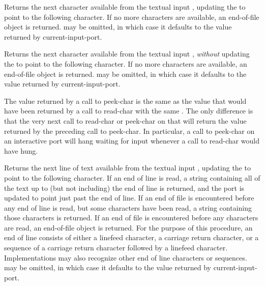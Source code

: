 \begin{entry}{%
}

Returns the next character available from the textual input ,
updating
the  to point to the following character.  If no more characters
are available, an end-of-file object is returned.   may be
omitted, in which case it defaults to the value returned by {\cf current-input-port}.

\end{entry}


\begin{entry}{%
}

Returns the next character available from the textual input ,
{\em without} updating
the  to point to the following character.  If no more characters
are available, an end-of-file object is returned.   may be
omitted, in which case it defaults to the value returned by {\cf current-input-port}.

\begin{note}
The value returned by a call to {\cf peek-char} is the same as the
value that would have been returned by a call to {\cf read-char} with the
same .  The only difference is that the very next call to
{\cf read-char} or {\cf peek-char} on that  will return the
value returned by the preceding call to {\cf peek-char}.  In particular, a call
to {\cf peek-char} on an interactive port will hang waiting for input
whenever a call to {\cf read-char} would have hung.
\end{note}

\end{entry}

\begin{entry}{%
}

Returns the next line of text available from the textual input
, updating the  to point to the following character.
If an end of line is read, a string containing all of the text up to
(but not including) the end of line is returned, and the port is updated
to point just past the end of line. If an end of file is encountered
before any end of line is read, but some characters have been
read, a string containing those characters is returned. If an end of
file is encountered before any characters are read, an end-of-file
object is returned.  For the purpose of this procedure, an end of line
consists of either a linefeed character, a carriage return character, or a
sequence of a carriage return character followed by a linefeed character.
Implementations may also recognize other end of line characters or sequences.
 may be omitted, in which case it defaults to the value returned
by {\cf current-input-port}.

\end{entry}


